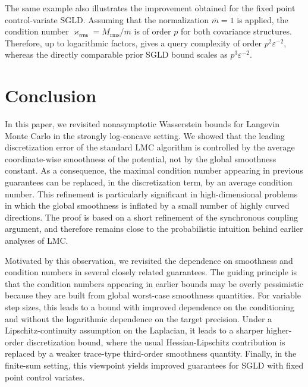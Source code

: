 \documentclass[aos,reqno]{imsart}
\def\kapparms{\varkappa_{\textsf{rms}}}
\def\Mtwo{M_{\mathrm{rms}}}
\def\mbar{\overline m}
\theoremstyle{definition}
\begin{document}
The same example also illustrates the improvement obtained
for the fixed point control-variate SGLD. Assuming that the
normalization $\mbar =1$ is applied, the condition number
$\kapparms=\Mtwo/\mbar$ is of order $p$ for both
covariance structures. Therefore, up to logarithmic
factors,  gives a query complexity of order
$p^2\varepsilon^{-2}$, whereas the directly comparable
prior SGLD bound scales as $p^3\varepsilon^{-2}$.

\section{Conclusion}
\label{Sec:conclusion}

In this paper, we revisited nonasymptotic Wasserstein
bounds for Langevin Monte Carlo in the strongly
log-concave setting. We showed that the leading
discretization error of the standard LMC algorithm is
controlled by the average coordinate-wise smoothness of
the potential, not by the global smoothness constant. As
a consequence, the maximal condition number appearing in
previous guarantees can be replaced, in the discretization
term, by an average condition number. This refinement is
particularly significant in high-dimensional problems in
which the global smoothness is inflated by a small number
of highly curved directions. The proof is based on a short
refinement of the synchronous coupling argument, and
therefore remains close to the probabilistic intuition
behind earlier analyses of LMC.

Motivated by this observation, we revisited the dependence
on smoothness and condition numbers in several closely
related guarantees. The guiding principle is that the
condition numbers appearing in earlier bounds may be
overly pessimistic because they are built from global
worst-case smoothness quantities. For variable step sizes,
this leads to a bound with improved dependence on the
conditioning and without the logarithmic dependence on the
target precision. Under a Lipschitz-continuity assumption
on the Laplacian, it leads to a sharper higher-order
discretization bound, where the usual Hessian-Lipschitz
contribution is replaced by a weaker trace-type
third-order smoothness quantity. Finally, in the finite-sum
setting, this viewpoint yields improved guarantees for
SGLD with fixed point control variates.
\end{document}
